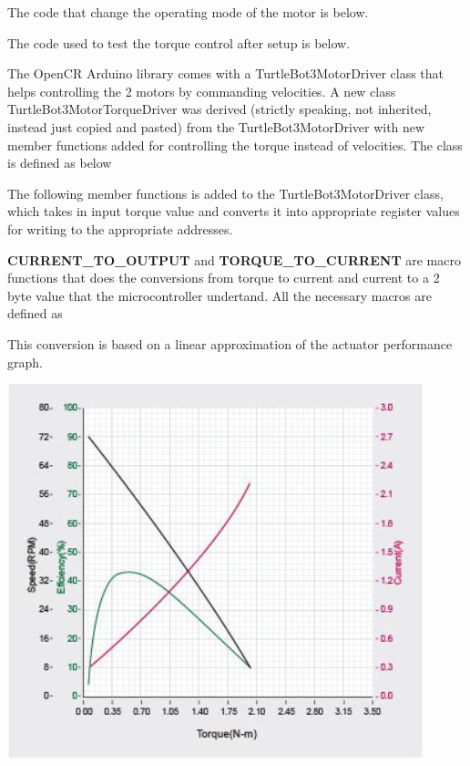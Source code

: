 \documentclass[12]{article}
\begin{document}
The code that change the operating mode of the motor is below. 



The code used to test the torque control after setup is below. 


The OpenCR Arduino library comes with a TurtleBot3MotorDriver class that helps controlling the 2 motors by commanding velocities. 
A new class TurtleBot3MotorTorqueDriver was derived (strictly speaking, not inherited, instead just copied and pasted) from the TurtleBot3MotorDriver with new member functions added for controlling the torque instead of velocities. 
The class is defined as below


The following member functions is added to the TurtleBot3MotorDriver class, which takes in input torque value and converts it into appropriate register values for writing to the appropriate addresses.


\textbf{CURRENT\_TO\_OUTPUT} and \textbf{TORQUE\_TO\_CURRENT} are macro functions that does the conversions from torque to current and current to a 2 byte value that the microcontroller undertand. 
All the necessary macros are defined as


This conversion is based on a linear approximation of the actuator performance graph.

\begin{center}
	\includegraphics[width=\linewidth]{images/xm430_performance.png}\\
\end{center}
\end{document}
